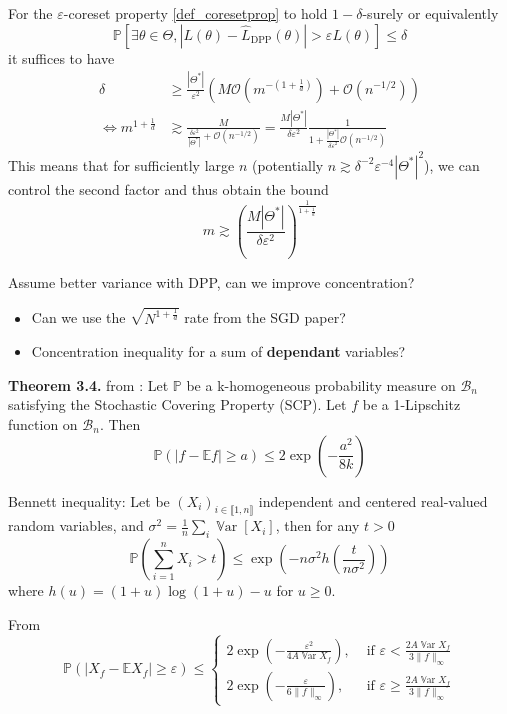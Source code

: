 \documentclass{article} %
\renewcommand{\epsilon}{\varepsilon}
\newcommand{\PP}{\mathbb{P}}
\newcommand{\OO}{\mathcal{O}}
\newcommand{\Var}{\operatorname{\mathbb V ar}}
\newcommand{\1}{\mathds{1}} %
\newcommand{\intint}[2]{\llbracket #1,#2 \rrbracket} %
\theoremstyle{definition} %
\begin{document}
For the $\epsilon$-coreset property \ref{def_coresetprop} to hold $1-\delta$-surely or equivalently  
\begin{equation}
	\PP \left[ \exists \theta \in \Theta,  |L(\theta)-\hat L_{\textrm{DPP}}(\theta)|>\epsilon L(\theta)\right] \leq \delta
\end{equation}
it suffices to have
\begin{align}
	\delta &\geq \frac{|\Theta^*|}{\epsilon^2} (M \OO(m^{-(1+\frac 1 d)}) + \OO(n^{-1/2})) \\
	\iff m^{1+\frac 1 d} &\gtrsim \frac{M}{\frac{\delta \epsilon^2}{|\Theta^*|} + \OO(n^{-1/2})} = \frac{M |\Theta^*|}{\delta \epsilon^2} \frac{1}{1 + \frac{|\Theta^*|}{\delta \epsilon^2}\OO(n^{-1/2})}
\end{align}
This means that for sufficiently large $n$ (potentially $n\gtrsim \delta^{-2} \epsilon^{-4} |\Theta^*|^2$), we can control the second factor and thus obtain the bound
\begin{equation}
	\boxed{m \gtrsim \left(\frac{M |\Theta^*|}{\delta \epsilon^2}\right) ^{\frac{1}{1+\frac 1 d}} }
\end{equation}




\begin{tcolorbox}
	Assume better variance with DPP, can we improve concentration?
\begin{itemize}
	\item Can we use the $\sqrt {N^{1 + \frac 1 d}}$ rate from the SGD paper?
	\item Concentration inequality for a sum of \textbf{dependant} variables?
\end{itemize}
\end{tcolorbox}

\textbf{Theorem 3.4.} from \cite{pemantle2011rayleighconcentration}: Let $\mathbb{P}$ be a k-homogeneous probability measure on $\mathcal{B}_{n}$ satisfying the Stochastic Covering Property (SCP). Let $f$ be a 1-Lipschitz function on $\mathcal{B}_{n}$. Then
$$
\mathbb{P}(\lvert f-\mathbb{E} f \rvert \geq a) \leq 2 \exp \left(-\frac{a^{2}}{8 k}\right)
$$

Bennett inequality: Let be $(X_i)_{i\in \intint{1}{n}}$ independent and centered real-valued random variables, and $\sigma^2 = \frac{1}{n}\sum_i \Var[X_i]$, then for any $t>0$
$$
\mathbb{P}\left(\sum_{i=1}^{n} X_{i}>t\right) \leq \exp \left(-n \sigma^{2} h\left(\frac{t}{n \sigma^{2}}\right)\right)
$$
where $h(u)=(1+u) \log (1+u)-u$ for $u \geq 0$.


From \cite{breuer2013nevai} $$\PP\left(\left|X_f-\mathbb{E} X_f\right| \geq \epsilon\right) \leq \begin{cases}2 \exp \left(-\frac{\epsilon^2}{4 A \Var X_f}\right), & \text { if } \epsilon<\frac{2 A \Var X_f}{3\|f\|_{\infty}} \\ 2 \exp \left(-\frac{\epsilon}{6\|f\|_{\infty}}\right), & \text { if } \epsilon \geq \frac{2 A \Var X_f}{3\|f\|_{\infty}}\end{cases}$$
\end{document}

